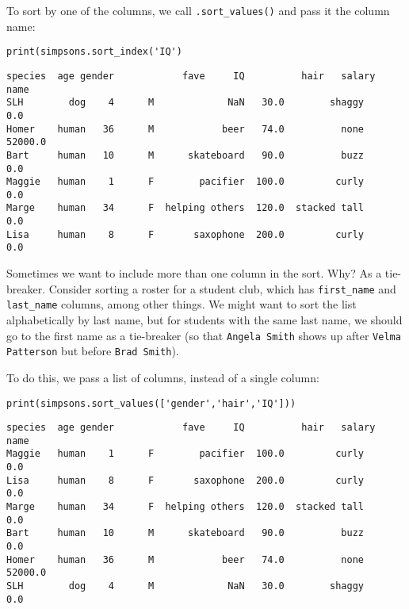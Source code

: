 To sort by one of the columns, we call \texttt{.sort\_values()} and pass it the
column name:

\begin{Verbatim}[fontsize=\small,samepage=true,frame=single,framesep=3mm]
print(simpsons.sort_index('IQ')
\end{Verbatim}
\vspace{-.2in}

\begin{Verbatim}[fontsize=\small,samepage=true,frame=leftline,framesep=5mm,framerule=1mm]
       species  age gender            fave     IQ          hair   salary
name                                                                    
SLH        dog    4      M             NaN   30.0        shaggy      0.0
Homer    human   36      M            beer   74.0          none  52000.0
Bart     human   10      M      skateboard   90.0          buzz      0.0
Maggie   human    1      F        pacifier  100.0         curly      0.0
Marge    human   34      F  helping others  120.0  stacked tall      0.0
Lisa     human    8      F       saxophone  200.0         curly      0.0
\end{Verbatim}


Sometimes we want to include more than one column in the sort. Why? As a
tie-breaker. Consider sorting a roster for a student club, which has
\texttt{first\_name} and \texttt{last\_name} columns, among other things. We
might want to sort the list alphabetically by last name, but for students with
the same last name, we should go to the first name as a tie-breaker (so that
\texttt{Angela Smith} shows up after \texttt{Velma Patterson} but before
\texttt{Brad Smith}).

To do this, we pass a list of columns, instead of a single column:

\begin{samepage}
\begin{Verbatim}[fontsize=\small,samepage=true,frame=single,framesep=3mm]
print(simpsons.sort_values(['gender','hair','IQ']))
\end{Verbatim}
\vspace{-.2in}

\begin{Verbatim}[fontsize=\small,samepage=true,frame=leftline,framesep=5mm,framerule=1mm]
       species  age gender            fave     IQ          hair   salary
name                                                                    
Maggie   human    1      F        pacifier  100.0         curly      0.0
Lisa     human    8      F       saxophone  200.0         curly      0.0
Marge    human   34      F  helping others  120.0  stacked tall      0.0
Bart     human   10      M      skateboard   90.0          buzz      0.0
Homer    human   36      M            beer   74.0          none  52000.0
SLH        dog    4      M             NaN   30.0        shaggy      0.0
\end{Verbatim}
\end{samepage}


